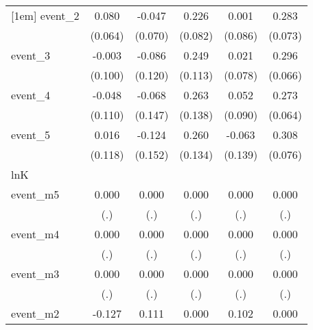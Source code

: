{\begin{tabular}{l*{5}{c}}
[1em]
event\_2     &       0.080         &      -0.047         &       0.226\sym{**} &       0.001         &       0.283\sym{***}\\
            &     (0.064)         &     (0.070)         &     (0.082)         &     (0.086)         &     (0.073)         \\
[1em]
event\_3     &      -0.003         &      -0.086         &       0.249\sym{*}  &       0.021         &       0.296\sym{***}\\
            &     (0.100)         &     (0.120)         &     (0.113)         &     (0.078)         &     (0.066)         \\
[1em]
event\_4     &      -0.048         &      -0.068         &       0.263         &       0.052         &       0.273\sym{***}\\
            &     (0.110)         &     (0.147)         &     (0.138)         &     (0.090)         &     (0.064)         \\
[1em]
event\_5     &       0.016         &      -0.124         &       0.260         &      -0.063         &       0.308\sym{***}\\
            &     (0.118)         &     (0.152)         &     (0.134)         &     (0.139)         &     (0.076)         \\
\hline
lnK         &                     &                     &                     &                     &                     \\
event\_m5    &       0.000         &       0.000         &       0.000         &       0.000         &       0.000         \\
            &         (.)         &         (.)         &         (.)         &         (.)         &         (.)         \\
[1em]
event\_m4    &       0.000         &       0.000         &       0.000         &       0.000         &       0.000         \\
            &         (.)         &         (.)         &         (.)         &         (.)         &         (.)         \\
[1em]
event\_m3    &       0.000         &       0.000         &       0.000         &       0.000         &       0.000         \\
            &         (.)         &         (.)         &         (.)         &         (.)         &         (.)         \\
[1em]
event\_m2    &      -0.127         &       0.111         &       0.000         &       0.102         &       0.000         \\

\end{tabular}}
